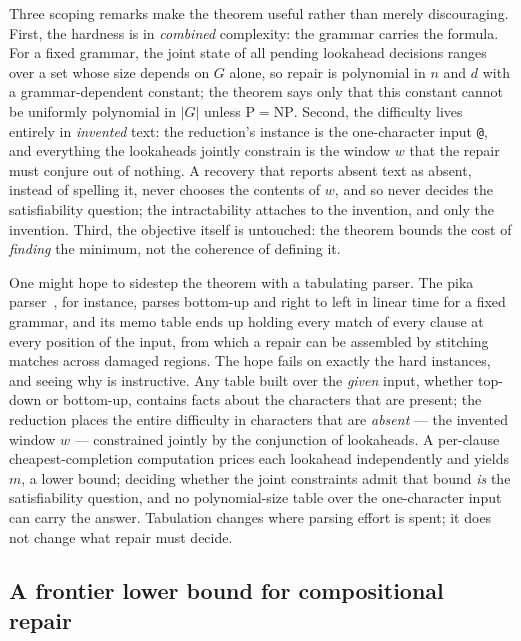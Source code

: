 \documentclass[manuscript]{acmart}
\newcommand{\cd}[1]{\texttt{#1}}
\begin{document}
Three scoping remarks make the theorem useful rather than merely discouraging. First, the hardness is in \emph{combined} complexity: the grammar carries the formula. For a fixed grammar, the joint state of all pending lookahead decisions ranges over a set whose size depends on $G$ alone, so repair is polynomial in $n$ and $d$ with a grammar-dependent constant; the theorem says only that this constant cannot be uniformly polynomial in $|G|$ unless $\mathrm{P} = \mathrm{NP}$. Second, the difficulty lives entirely in \emph{invented} text: the reduction's instance is the one-character input \cd{@}, and everything the lookaheads jointly constrain is the window $w$ that the repair must conjure out of nothing. A recovery that reports absent text as absent, instead of spelling it, never chooses the contents of $w$, and so never decides the satisfiability question; the intractability attaches to the invention, and only the invention. Third, the objective itself is untouched: the theorem bounds the cost of \emph{finding} the minimum, not the coherence of defining it.

One might hope to sidestep the theorem with a tabulating parser. The pika parser~\cite{hutchison2020}, for instance, parses bottom-up and right to left in linear time for a fixed grammar, and its memo table ends up holding every match of every clause at every position of the input, from which a repair can be assembled by stitching matches across damaged regions. The hope fails on exactly the hard instances, and seeing why is instructive. Any table built over the \emph{given} input, whether top-down or bottom-up, contains facts about the characters that are present; the reduction places the entire difficulty in characters that are \emph{absent} --- the invented window $w$ --- constrained jointly by the conjunction of lookaheads. A per-clause cheapest-completion computation prices each lookahead independently and yields $m$, a lower bound; deciding whether the joint constraints admit that bound \emph{is} the satisfiability question, and no polynomial-size table over the one-character input can carry the answer. Tabulation changes where parsing effort is spent; it does not change what repair must decide.

\subsection{A frontier lower bound for compositional repair}
\label{sec:frontier}
\end{document}
